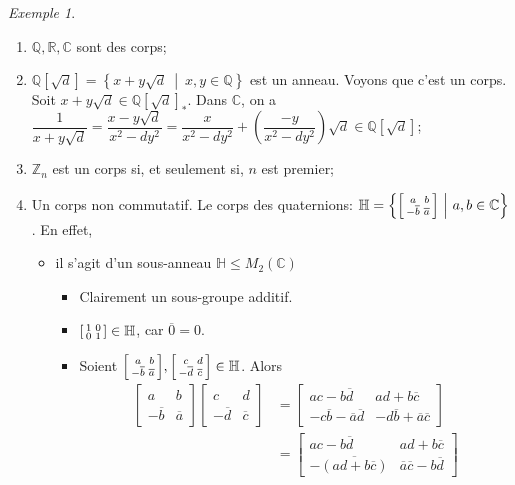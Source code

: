 \documentclass{report}
\theoremstyle{definition}
\theoremstyle{remark}
\newtheorem*{exem}{Exemple}
\def\lte{\leqslant}
\def\ZZ{\mathbb{Z}}
\def\QQ{\mathbb{Q}}
\def\RR{\mathbb{R}}
\def\CC{\mathbb{C}}
\begin{document}
	\begin{exem}
		\begin{enumerate}
			\item $\QQ, \RR, \CC$ sont des corps;
			\item $\QQ[\sqrt{d}] = \left\{ x+y\sqrt{d} ~\middle|~ x,y \in \QQ \right\}$ est un anneau. Voyons que c'est un corps. Soit $x+y\sqrt{d} \in \QQ[\sqrt{d}]_*$. Dans $\CC$, on a $\dfrac{1}{x+y\sqrt{d}} = \dfrac{x-y\sqrt{d}}{x^2-dy^2} = \dfrac{x}{x^2-dy^2} + \left(\dfrac{-y}{x^2-dy^2}\right)\sqrt{d} \in \QQ[\sqrt{d}]$;
			\item $\ZZ_n$ est un corps si, et seulement si, $n$ est premier;
			\item Un corps non commutatif. Le corps des quaternions: $\mathbb{H} = \left\{ \begin{bsmallmatrix}
				a&b\\-\overline{b}&\overline{a}
			\end{bsmallmatrix} ~\middle|~ a,b\in\CC \right\}$. En effet,
			\begin{itemize}
				\item il s'agit d'un sous-anneau $\mathbb{H}\lte M_2(\CC)$
				\begin{itemize}
					\item Clairement un sous-groupe additif.
					\item $\begin{bsmallmatrix}
						1&0\\0&1
					\end{bsmallmatrix}\in\mathbb{H}$, car $\overline0=0$.
					\item Soient $\begin{bsmallmatrix}
						a&b\\-\overline{b}&\overline{a}
					\end{bsmallmatrix}, \begin{bsmallmatrix}
						c&d\\-\overline{d}&\overline{c}
					\end{bsmallmatrix}\in\mathbb{H}$. Alors
					\begin{align*}
						\begin{bmatrix}
							a&b\\-\overline{b}&\overline{a}
						\end{bmatrix} \begin{bmatrix}
							c&d\\-\overline{d}&\overline{c}
						\end{bmatrix}&= \begin{bmatrix}
							ac-b\overline{d}&ad+b\overline{c}\\
							-c\overline{b}-\overline{a}\overline{d}&-d\overline{b}+\overline{a}\overline{c}
						\end{bmatrix}\\
						&= \begin{bmatrix}
							ac-b\overline{d}&ad+b\overline{c}\\
							-\overline{(ad+b\overline{c})}&\overline{a}\overline{c}-b\overline{d}
						\end{bmatrix}
					\end{align*}


\end{itemize}
\end{itemize}
\end{enumerate}
\end{exem}
\end{document}
